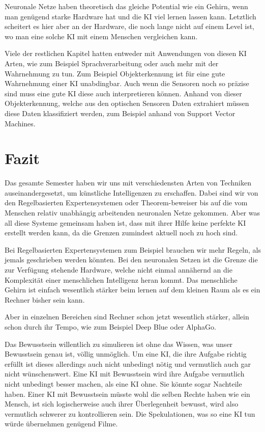 Neuronale Netze haben theoretisch das gleiche Potential wie ein Gehirn, wenn man genügend starke Hardware hat und die KI viel lernen lassen kann.
Letztlich scheitert es hier aber an der Hardware, die noch lange nicht auf einem Level ist, wo man eine solche KI mit einem Menschen vergleichen kann.

Viele der restlichen Kapitel hatten entweder mit Anwendungen von diesen KI Arten, wie zum Beispiel Sprachverarbeitung oder auch mehr mit der Wahrnehmung zu tun.
Zum Beispiel Objekterkennung ist für eine gute Wahrnehmung einer KI unabdingbar.
Auch wenn die Sensoren noch so präzise sind muss eine gute KI diese auch interpretieren können.
Anhand von dieser Objekterkennung, welche aus den optischen Sensoren Daten extrahiert müssen diese Daten klassifiziert werden, zum Beispiel anhand von Support Vector Machines.

\section{Fazit}
Das gesamte Semester haben wir uns mit verschiedensten Arten von Techniken auseinandergesetzt, um künstliche Intelligenzen zu erschaffen.
Dabei sind wir von den Regelbasierten Expertensystemen oder Theorem-beweiser bis auf die vom Menschen relativ unabhängig arbeitenden neuronalen Netze gekommen.
Aber was all diese Systeme gemeinsam haben ist, dass mit ihrer Hilfe keine perfekte KI erstellt werden kann, da die Grenzen zumindest aktuell noch zu hoch sind.

Bei Regelbasierten Expertensystemen zum Beispiel brauchen wir mehr Regeln, als jemals geschrieben werden könnten.
Bei den neuronalen Setzen ist die Grenze die zur Verfügung stehende Hardware, welche nicht einmal annähernd an die Komplexität einer menschlichen Intelligenz heran kommt.
Das menschliche Gehirn ist einfach wesentlich stärker beim lernen auf dem kleinen Raum als es ein Rechner bisher sein kann.

Aber in einzelnen Bereichen sind Rechner schon jetzt wesentlich stärker, allein schon durch ihr Tempo, wie zum Beispiel Deep Blue oder AlphaGo.

Das Bewusstsein willentlich zu simulieren ist ohne das Wissen, was unser Bewusstsein genau ist, völlig unmöglich.
Um eine KI, die ihre Aufgabe richtig erfüllt ist dieses allerdings auch nicht unbedingt nötig und vermutlich auch gar nicht wünschenswert.
Eine KI mit Bewusstsein wird ihre Aufgabe vermutlich nicht unbedingt besser machen, als eine KI ohne.
Sie könnte sogar Nachteile haben.
Einer KI mit Bewusstsein müsste wohl die selben Rechte haben wie ein Mensch, ist sich logischerweise auch ihrer Überlegenheit bewusst, wird also vermutlich schwerer zu kontrollieren sein.
Die Spekulationen, was so eine KI tun würde übernehmen genügend Filme.

